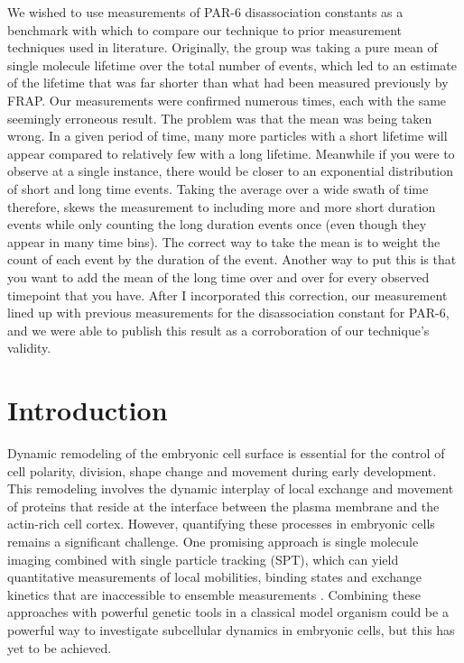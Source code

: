 We wished to use measurements of PAR-6 disassociation constants as a benchmark with which to compare our technique to prior measurement techniques used in literature.  Originally, the group was taking a pure mean of single molecule lifetime over the total number of events, which led to an estimate of the lifetime that was far shorter than what had been measured previously by FRAP.  Our measurements were confirmed numerous times, each with the same seemingly erroneous result.  The problem was that the mean was being taken wrong.  In a given period of time, many more particles with a short lifetime will appear compared to relatively few with a long lifetime.  Meanwhile if you were to observe at a single instance, there would be closer to an exponential distribution of short and long time events. Taking the average over a wide swath of time therefore, skews the measurement to including more and more short duration events while only counting the long duration events once (even though they appear in many time bins). The correct way to take the mean is to weight the count of each event by the duration of the event.  Another way to put this is that you want to add the mean of the long time over and over for every observed timepoint that you have.  After I incorporated this correction, our measurement lined up with previous measurements for the disassociation constant for PAR-6, and we were able to publish this result as a corroboration of our technique's validity.

\section{Introduction}
 
 Dynamic remodeling of the embryonic cell surface is essential for the control of cell polarity, division, shape change and movement during early development. This remodeling involves the dynamic interplay of local exchange and movement of proteins that reside at the interface between the plasma membrane and the actin-rich cell cortex. However, quantifying these processes in embryonic cells remains a significant challenge. One promising approach is single molecule imaging combined with single particle tracking (SPT), which can yield quantitative measurements of local mobilities, binding states and exchange kinetics that are inaccessible to ensemble measurements \cite{nmeth1,nmeth2,nmeth3}. Combining these approaches with powerful genetic tools in a classical model organism could be a powerful way to investigate subcellular dynamics in embryonic cells, but this has yet to be achieved.
 
